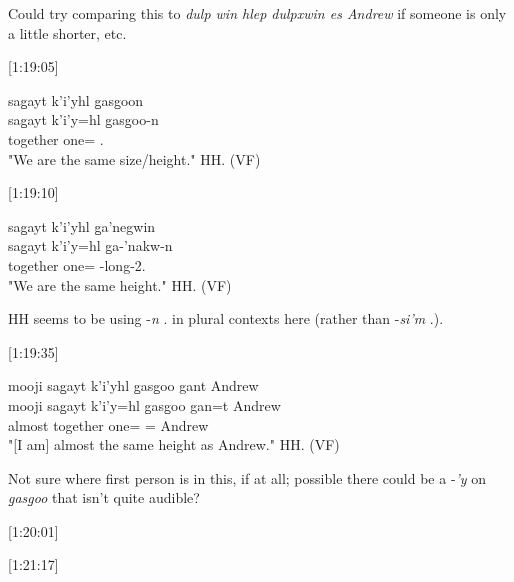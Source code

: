 Could try comparing this to \textit{dulp win hlep dulpxwin es Andrew} if someone is only a little shorter, etc.

[1:19:05]
\begin{exe}
    \ex \glll
    sag̱ayt k’i’yhl g̱asg̱oon \\
    sag̱ayt k’i’y=hl g̱asg̱oo-n \\
    together one=\Cn{} .\Ii \\
    \glt "We are the same size/height." \hfill HH.\ElicitationDate{} (VF)
\end{exe}

[1:19:10]
\begin{exe}
    \ex \glll
    sag̱ayt k’i’yhl g̱a’negwin \\
    sag̱ayt k’i’y=hl g̱a-’nakw-n \\
    together one=\Cn{} \Distr-long-2.\Ii \\
    \glt "We are the same height." \hfill HH.\ElicitationDate{} (VF)
\end{exe}

HH seems to be using -\textit{n} \Ssg.\Ii{} in plural contexts here (rather than -\textit{si'm} \Spl.\Ii).

[1:19:35]
\begin{exe}
    \ex \glll
    mooji sag̱ayt k’i’yhl g̱asg̱oo gant Andrew \\
    mooji sag̱ayt k’i’y=hl g̱asg̱oo gan=t Andrew \\
    almost together one=\Cn{} \Mass=\Pn{} Andrew \\
    \glt "[I am] almost the same height as Andrew." \hfill HH.\ElicitationDate{} (VF)
\end{exe}

Not sure where first person is in this, if at all; possible there could be a -\textit{'y} on \textit{g̱asg̱oo} that isn't quite audible?

[1:20:01]
\begin{exe}
\end{exe}

[1:21:17]
\begin{exe}
\end{exe}

